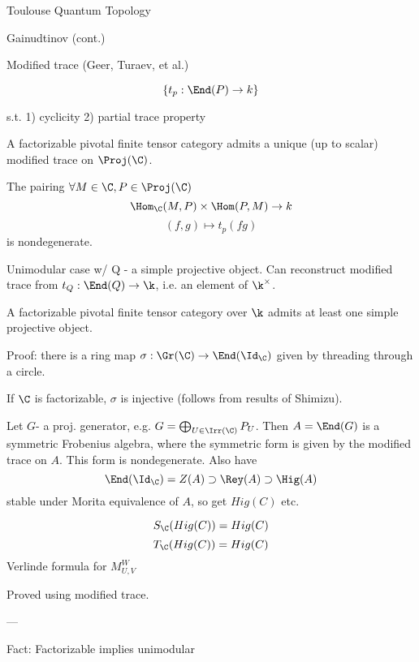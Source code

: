 Toulouse Quantum Topology

Gainudtinov (cont.)

Modified trace (Geer, Turaev, et al.)

$$\{ t_p : \End(P) \to k \}$$

s.t. 1) cyclicity 2) partial trace property

\begin{theorem}[G - Runkel `17]
A factorizable pivotal finite tensor category admits a unique (up 
to scalar) modified trace on $\Proj(\C)$.

The pairing $\forall M \in \C, P \in \Proj(\C)$
$$\Hom_\C(M, P) \times \Hom(P, M) \to k$$
$$(f,g) \mapsto t_p(fg)$$
is nondegenerate. 
\end{theorem}


Unimodular case w/  Q - a simple projective object.  Can reconstruct
modified trace from $t_Q : \End(Q) \to \k$, i.e. an element of $\k^\times$.


\begin{theorem}
A factorizable pivotal finite tensor category over $\k$  admits
at least one simple projective object.
\end{theorem}

Proof: there is a ring map $\sigma: \Gr(\C) \to \End(\Id_\C)$ given
by threading through a circle.

\begin{prop}
If $\C$ is factorizable, $\sigma$ is injective (follows from results of
Shimizu).
\end{prop}


Let $G$- a proj. generator, e.g. $G = \bigoplus_{U \in \Irr(\C)} P_U$.
Then $A = \End(G)$ is a symmetric Frobenius algebra, where the symmetric form is given by the modified trace on $A$. This form is nondegenerate.  Also have
$$\End(\Id_\C) = Z(A) \supset  \Rey(A) \supset \Hig(A)$$
stable under Morita equivalence of $A$, so get $Hig(C)$ etc.

\begin{theorem}
$$S_\C(Hig(C)) = Hig(C)$$
$$T_\C(Hig(C)) = Hig(C)$$
Verlinde formula for $M_{U,V}^W$
\end{theorem}

Proved using modified trace.

---

Fact: Factorizable implies unimodular

